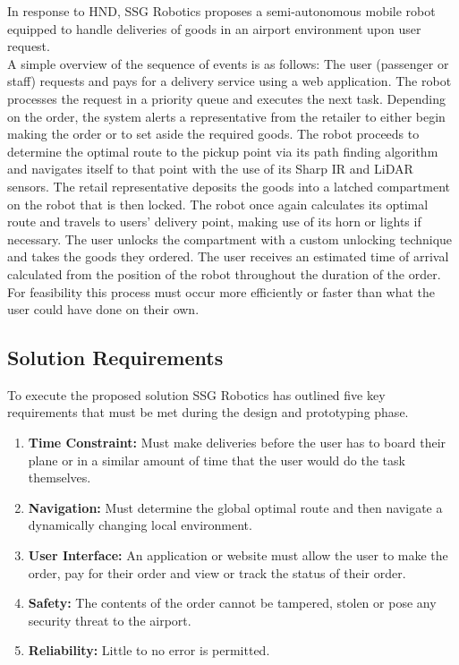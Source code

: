 \documentclass[letterpaper,fleqn,oneside]{template}
\begin{document}
In response to HND, SSG Robotics proposes a semi-autonomous mobile robot equipped to handle deliveries of goods in an airport environment upon user request.\\

A simple overview of the sequence of events is as follows: The user (passenger or staff) requests and pays for a delivery service using a web application. The robot processes the request in a priority queue and executes the next task. Depending on the order, the system alerts a representative from the retailer to either begin making the order or to set aside the required goods. The robot proceeds to determine the optimal route to the pickup point via its path finding algorithm and navigates itself to that point with the use of its Sharp IR and LiDAR sensors. The retail representative deposits the goods into a latched compartment on the robot that is then locked. The robot once again calculates its optimal route and travels to users’ delivery point, making use of its horn or lights if necessary. The user unlocks the compartment with a custom unlocking technique and takes the goods they ordered. The user receives an estimated time of arrival calculated from the position of the robot throughout the duration of the order. For feasibility this process must occur more efficiently or faster than what the user could have done on their own.

\subsection{Solution Requirements}

To execute the proposed solution SSG Robotics has outlined five key requirements that must be met during the design and prototyping phase. 

\begin{enumerate}
    \item \textbf{Time Constraint:} Must make deliveries before the user has to board their plane or in a similar amount of time that the user would do the task themselves.
    \item \textbf{Navigation:} Must determine the global optimal route and then navigate a dynamically changing local environment.
    \item \textbf{User Interface:} An application or website must allow the user to make the order, pay for their order and view or track the status of their order.
    \item \textbf{Safety:} The contents of the order cannot be tampered, stolen or pose any security threat to the airport.
    \item \textbf{Reliability:} Little to no error is permitted.
\end{enumerate}
\end{document}
